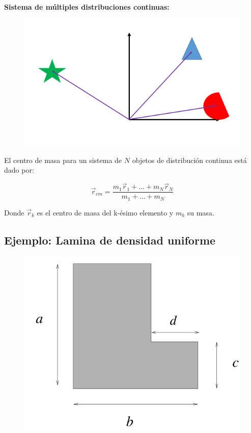 \documentclass[a4paper,11pt]{article}
\begin{document}
\textbf{Sistema de múltiples distribuciones continuas:}\\



\begin{figure}
	\includegraphics[scale=0.5]{./im/muchos3d}
\end{figure}

El centro de masa para un sistema de $N$ objetos de distribución continua está dado por:

\begin{equation}
 \vec{r}_{cm} = \frac{m_1\vec{r}_1 + \dots + m_N \vec{r}_N}{m_1 + \dots + m_N}
\end{equation}



Donde $ \vec{r}_k$ es el centro de masa del k-ésimo elemento y $m_k$ su masa.


\subsection{Ejemplo: Lamina de densidad uniforme} 


\begin{figure}
	\includegraphics[scale=0.5]{./im/4}
\end{figure}
\end{document}
